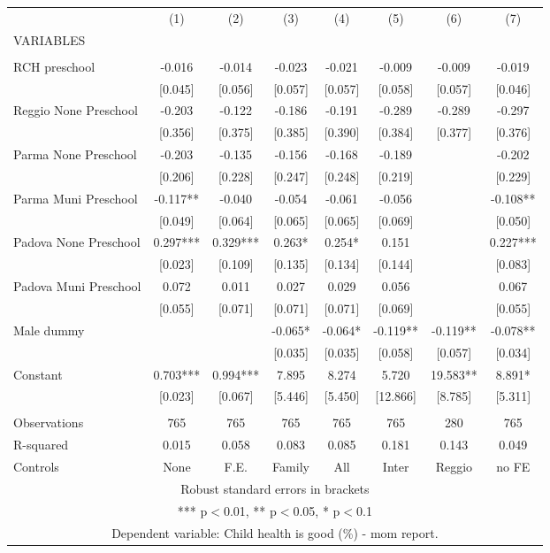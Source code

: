 \begin{tabular}{lccccccc} \hline
 & (1) & (2) & (3) & (4) & (5) & (6) & (7) \\
VARIABLES &  &  &  &  &  &  &  \\ \hline
 &  &  &  &  &  &  &  \\
RCH preschool & -0.016 & -0.014 & -0.023 & -0.021 & -0.009 & -0.009 & -0.019 \\
 & [0.045] & [0.056] & [0.057] & [0.057] & [0.058] & [0.057] & [0.046] \\
Reggio None Preschool & -0.203 & -0.122 & -0.186 & -0.191 & -0.289 & -0.289 & -0.297 \\
 & [0.356] & [0.375] & [0.385] & [0.390] & [0.384] & [0.377] & [0.376] \\
Parma None Preschool & -0.203 & -0.135 & -0.156 & -0.168 & -0.189 &  & -0.202 \\
 & [0.206] & [0.228] & [0.247] & [0.248] & [0.219] &  & [0.229] \\
Parma Muni Preschool & -0.117** & -0.040 & -0.054 & -0.061 & -0.056 &  & -0.108** \\
 & [0.049] & [0.064] & [0.065] & [0.065] & [0.069] &  & [0.050] \\
Padova None Preschool & 0.297*** & 0.329*** & 0.263* & 0.254* & 0.151 &  & 0.227*** \\
 & [0.023] & [0.109] & [0.135] & [0.134] & [0.144] &  & [0.083] \\
Padova Muni Preschool & 0.072 & 0.011 & 0.027 & 0.029 & 0.056 &  & 0.067 \\
 & [0.055] & [0.071] & [0.071] & [0.071] & [0.069] &  & [0.055] \\
Male dummy &  &  & -0.065* & -0.064* & -0.119** & -0.119** & -0.078** \\
 &  &  & [0.035] & [0.035] & [0.058] & [0.057] & [0.034] \\
Constant & 0.703*** & 0.994*** & 7.895 & 8.274 & 5.720 & 19.583** & 8.891* \\
 & [0.023] & [0.067] & [5.446] & [5.450] & [12.866] & [8.785] & [5.311] \\
 &  &  &  &  &  &  &  \\
Observations & 765 & 765 & 765 & 765 & 765 & 280 & 765 \\
R-squared & 0.015 & 0.058 & 0.083 & 0.085 & 0.181 & 0.143 & 0.049 \\
 Controls & None & F.E. & Family & All & Inter & Reggio & no FE \\ \hline
\multicolumn{8}{c}{ Robust standard errors in brackets} \\
\multicolumn{8}{c}{ *** p$<$0.01, ** p$<$0.05, * p$<$0.1} \\
\multicolumn{8}{c}{ Dependent variable: Child health is good (\%) - mom report.} \\
\end{tabular}
